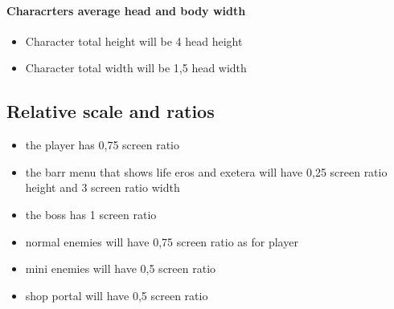 \paragraph{Characrters average head and body width}
\begin{itemize}
\item Character total height will be 4 head height
\item Character total width will be 1,5 head width
\end{itemize}

\subsection{Relative scale and ratios}
\begin{itemize}
\item the player has 0,75 screen ratio
\item the barr menu that shows life eros and exetera will have
0,25 screen ratio height and 3 screen ratio width
\item the boss has 1 screen ratio
\item normal enemies will have 0,75 screen ratio as for player
\item mini enemies will have 0,5 screen ratio
\item shop portal will have 0,5 screen ratio
\end{itemize}


